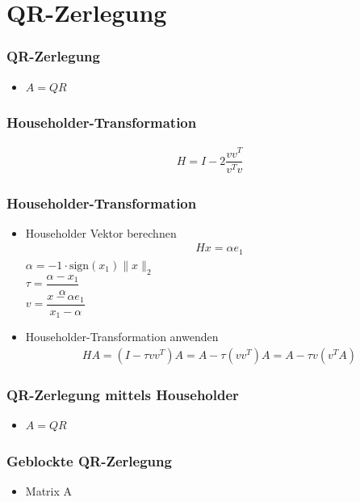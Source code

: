 \section{QR-Zerlegung}
\begin{frame}
	\frametitle{QR-Zerlegung}
	\vspace{-4cm}
	\begin{itemize}
		\item $ A = QR $
	\end{itemize}
\end{frame}

\begin{frame}
	\frametitle{Householder-Transformation}
	\vspace{-1cm}
	\begin{align*}
		H = I - 2 \dfrac{vv^T}{v^Tv}
	\end{align*}
	\centering
	\scalebox{.8}{}

\end{frame}

\begin{frame}
	\frametitle{Householder-Transformation}
	\vspace{-1cm}
	\begin{itemize}
	\item Householder Vektor berechnen
		\begin{align*}
			Hx = \alpha e_1
		\end{align*}
		$\alpha = -1 \cdot \text{sign}(x_1) \|x\|_2$\\
		$\tau = \dfrac{\alpha - x_1}{\alpha}$\\
		$v=\dfrac{x - \alpha e_1}{x_1 - \alpha}$ 

	\item  Householder-Transformation anwenden
		\begin{align*} 
		H A =(I - \tau vv^T) A= A - \tau (vv^T )A = A - \tau v(v^TA)
		\end{align*}
	\end{itemize}
\end{frame}

\begin{frame}
	\frametitle{QR-Zerlegung mittels Householder}
	\vspace{-4cm}
	\begin{itemize}
		\item $ A = QR $
	\end{itemize}
\end{frame}

\begin{frame}
	\frametitle{Geblockte QR-Zerlegung}
	\begin{itemize}
		\item Matrix A\\
		\centering
		
	\end{itemize}
\end{frame}

